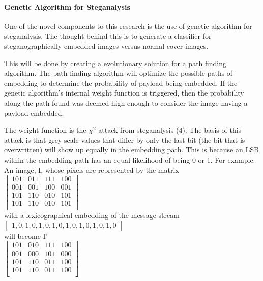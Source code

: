 \documentclass[12pt]{article}
\begin{document}
\paragraph{Genetic Algorithm for Steganalysis}
\par One of the novel components to this research is the use of genetic algorithm for steganalysis. The thought behind this is to generate a classifier for steganographically embedded images versus normal cover images.
\par This will be done by creating a evolutionary solution for a path finding algorithm. The path finding algorithm will optimize the possible paths of embedding to determine the probability of payload being embedded. If the genetic algorithm's internal weight function is triggered, then the probability along the path found was deemed high enough to consider the image having a payload embedded.
\par The weight function is the $\chi ^ 2$-attack from steganalysis (4). The basis of this attack is that grey scale values that differ by only the last bit (the bit that is overwritten) will show up equally in the embedding path. This is because an LSB within the embedding path has an equal likelihood of being 0 or 1.
For example: \\
An image, I, whose pixels are represented by the matrix \\
$ \left[ \begin{array}{cccc}
 101 & 011 & 111 & 100\\
  001 & 001 & 100 & 001\\
 101 & 110 & 010 & 101 \\
 101 & 110 & 010 & 101 \\  \end{array} \right] $ 
 \\ with a lexicographical embedding of the message stream 
 \\ $ \left[ \begin{array}{c} 1,  0 , 1,  0,  1,  0,  1,  0,  1,  0,  1,  0,  1,  0,  1,  0 \end{array} \right] $
\\ will become I'
 \\ $ \left[ \begin{array}{cccc}
 101 & 010 & 111 & 100\\
  001 & 000 & 101 & 000\\
 101 & 110 & 011 & 100 \\
 101 & 110 & 011 & 100 \\  \end{array} \right] $ 
 
\end{document}
